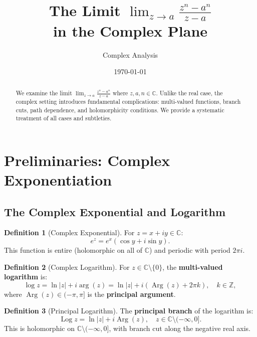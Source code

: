 \documentclass{article}
\title{The Limit $\displaystyle\lim_{z \to a} \frac{z^n - a^n}{z - a}$ \\ in the Complex Plane}
\author{Complex Analysis}
\date{\today}
\theoremstyle{definition}
\newtheorem{definition}{Definition}[section]
\theoremstyle{remark}
\newcommand{\C}{\mathbb{C}}
\newcommand{\Z}{\mathbb{Z}}
\newcommand{\Log}{\operatorname{Log}}
\newcommand{\Arg}{\operatorname{Arg}}
\begin{document}
\maketitle

\begin{abstract}
We examine the limit $\lim_{z \to a} \frac{z^n - a^n}{z - a}$ where $z, a, n \in \C$. Unlike the real case, the complex setting introduces fundamental complications: multi-valued functions, branch cuts, path dependence, and holomorphicity conditions. We provide a systematic treatment of all cases and subtleties.
\end{abstract}

\tableofcontents

\section{Preliminaries: Complex Exponentiation}

\subsection{The Complex Exponential and Logarithm}

\begin{definition}[Complex Exponential]
For $z = x + iy \in \C$:
\begin{equation}
e^z = e^x(\cos y + i \sin y).
\end{equation}
This function is entire (holomorphic on all of $\C$) and periodic with period $2\pi i$.
\end{definition}

\begin{definition}[Complex Logarithm]
For $z \in \C \setminus \{0\}$, the \textbf{multi-valued logarithm} is:
\begin{equation}
\log z = \ln|z| + i \arg(z) = \ln|z| + i(\Arg(z) + 2\pi k), \quad k \in \Z,
\end{equation}
where $\Arg(z) \in (-\pi, \pi]$ is the \textbf{principal argument}.
\end{definition}

\begin{definition}[Principal Logarithm]
The \textbf{principal branch} of the logarithm is:
\begin{equation}
\Log z = \ln|z| + i\Arg(z), \quad z \in \C \setminus (-\infty, 0].
\end{equation}
This is holomorphic on $\C \setminus (-\infty, 0]$, with branch cut along the negative real axis.
\end{definition}
\end{document}

